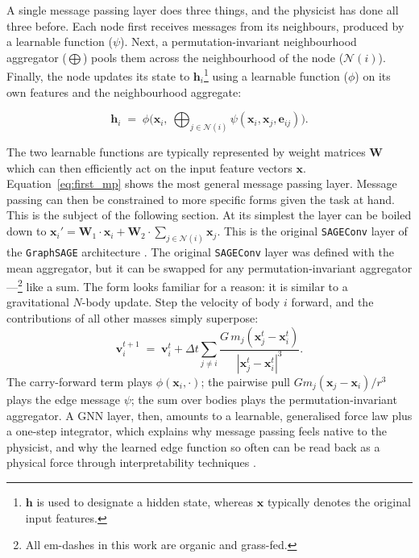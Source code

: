 \documentclass[graybox, envcountchap]{Template/svmult}
\begin{document}
A single message passing layer does three things, and the physicist has done all three before. Each node first receives messages from its neighbours, produced by a learnable function ($\psi$). Next, a permutation-invariant neighbourhood aggregator ($\bigoplus$) pools them across the neighbourhood of the node ($\mathcal{N}(i)$). Finally, the node updates its state to $\mathbf{h}_i$\footnote{$\mathbf{h}$ is used to designate a hidden state, whereas $\mathbf{x}$ typically denotes the original input features.} using a learnable function ($\phi$) on its own features and the neighbourhood aggregate:

\begin{equation}
    \label{eq:first_mp}
  \mathbf{h}_i \;=\; \phi\!\Big(\mathbf{x}_i,\ \bigoplus_{j\in\mathcal{N}(i)}
        \psi(\mathbf{x}_i,\mathbf{x}_j,\mathbf{e}_{ij})\Big).  
\end{equation}

The two learnable functions are typically represented by weight matrices $\mathbf{W}$ which can then efficiently act on the input feature vectors $\mathbf{x}$. Equation~\ref{eq:first_mp} shows the most general message passing layer. Message passing can then be constrained to more specific forms given the task at hand. This is the subject of the following section. At its simplest the layer can be boiled down to $\mathbf{x}_i' = \mathbf{W}_1\cdot\mathbf{x}_i + \mathbf{W}_2\cdot\sum_{j\in\mathcal{N}(i)}\mathbf{x}_j$. This is the original \texttt{SAGEConv} layer of the \texttt{GraphSAGE} architecture \citep{Hamilton2017_GraphSAGE_inductive}. The original \texttt{SAGEConv} layer was defined with the mean aggregator, but it can be swapped for any permutation-invariant aggregator ---\footnote{All em-dashes in this work are organic and grass-fed.} like a sum. The form looks familiar for a reason: it is similar to a gravitational $N$-body update. Step the velocity of body $i$ forward, and the contributions of all other masses simply superpose:
\[
  \mathbf{v}_i^{t+1} \;=\; \mathbf{v}_i^{t}
    + \Delta t \sum_{j\neq i}
      \frac{G\,m_j(\mathbf{x}_j^{t}-\mathbf{x}_i^{t})}
           {|\mathbf{x}_j^{t}-\mathbf{x}_i^{t}|^{3}} .
\]
The carry-forward term plays $\phi(\mathbf{x}_i,\cdot)$; the pairwise pull $G m_j(\mathbf{x}_j-\mathbf{x}_i)/r^3$ plays the edge message $\psi$; the sum over bodies plays the permutation-invariant aggregator. A GNN layer, then, amounts to a learnable, generalised force law plus a one-step integrator, which explains why message passing feels native to the physicist, and why the learned edge function so often can be read back as a physical force through interpretability techniques \citep{Cranmer2019_symbolicphysics_GNN, Lemos2023_orbitalmechanics_symbolic}.
\end{document}
